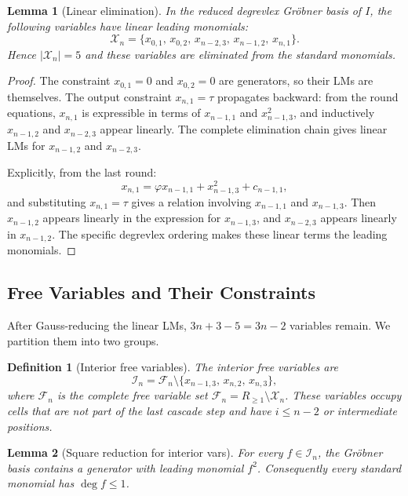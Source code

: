 \documentclass[a4paper,11pt]{article}
\newtheorem{lemma}{Lemma}
\newtheorem{definition}{Definition}
\begin{document}
\begin{lemma}[Linear elimination]\label{lem:fixed_t3}
In the reduced degrevlex Gr\"obner basis of $I$, the following variables
have linear leading monomials:
\[
\mathcal{X}_n = \{x_{0,1},\, x_{0,2},\, x_{n-2,3},\, x_{n-1,2},\, x_{n,1}\}.
\]
Hence $|\mathcal{X}_n| = 5$ and these variables are eliminated from the
standard monomials.
\end{lemma}

\begin{proof}
The constraint $x_{0,1} = 0$ and $x_{0,2} = 0$ are generators, so their
LMs are themselves. The output constraint $x_{n,1} = \tau$ propagates
backward: from the round equations, $x_{n,1}$ is expressible in terms of
$x_{n-1,1}$ and $x_{n-1,3}^2$, and inductively
$x_{n-1,2}$ and $x_{n-2,3}$ appear linearly. The complete elimination
chain gives linear LMs for $x_{n-1,2}$ and $x_{n-2,3}$.

Explicitly, from the last round:
\[
x_{n,1} = \varphi x_{n-1,1} + x_{n-1,3}^2 + c_{n-1,1},
\]
and substituting $x_{n,1} = \tau$ gives a relation involving
$x_{n-1,1}$ and $x_{n-1,3}$. Then $x_{n-1,2}$ appears linearly in the
expression for $x_{n-1,3}$, and $x_{n-2,3}$ appears linearly in
$x_{n-1,2}$. The specific degrevlex ordering makes these linear terms
the leading monomials.
\end{proof}

\subsection{Free Variables and Their Constraints}

After Gauss-reducing the linear LMs, $3n+3 - 5 = 3n-2$ variables remain.
We partition them into two groups.

\begin{definition}[Interior free variables]\label{def:interior_t3}
The \emph{interior} free variables are
\[
\mathcal{I}_n = \mathcal{F}_n \setminus \{x_{n-1,3},\, x_{n,2},\, x_{n,3}\},
\]
where $\mathcal{F}_n$ is the complete free variable set
$\mathcal{F}_n = R_{\ge 1} \setminus \mathcal{X}_n$.
These variables occupy cells that are not part of the last cascade step
and have $i \le n-2$ or intermediate positions.
\end{definition}

\begin{lemma}[Square reduction for interior vars]\label{lem:square_t3}
For every $f \in \mathcal{I}_n$, the Gr\"obner basis contains a
generator with leading monomial $f^2$. Consequently every standard
monomial has $\deg f \le 1$.
\end{lemma}
\end{document}
